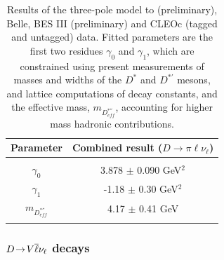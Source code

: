 \begin{table}[htbp]
\caption{Results of the three-pole model to \babar (preliminary), Belle, BES III (preliminary) and CLEOc (tagged and untagged) data. 
Fitted parameters are the first two residues 
$\gamma_0$  and $\gamma_{1}$, which are constrained using present measurements 
of masses and widths of the $D^\ast$ and $D^{\ast '}$ mesons, and lattice computations of decay constants, and the effective mass,  
$m_{D^{\ast ''}_{eff}}$, 
accounting for higher mass hadronic contributions. 
\label{3Pole_pi}}
\begin{center}
\begin{tabular}{cc}
\hline 
Parameter & Combined result ($D \to \pi \ell \nu_\ell $) \\ 
\hline 
\vspace*{-10pt} & \\
\hline
$\gamma_0$  & 3.878 $\pm$ 0.090  GeV$^2$ \\
$\gamma_1$  & -1.18 $\pm$ 0.30  GeV$^2$  \\
$m_{D^{\ast ''}_{eff}}$  & 4.17 $\pm$ 0.41 GeV \\
\hline
\vspace*{-10pt} & \\
\hline
\end{tabular}
\end{center}
\end{table}

\subsubsection{$D\!\rightarrow\! V\overline \ell \nu_\ell$ decays}

